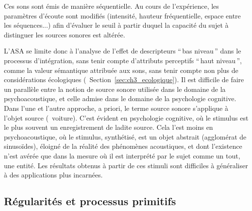Ces sons sont émis de manière séquentielle. Au cours de l'expérience, les paramètres d'écoute sont modifiés (intensité, hauteur fréquentielle, espace entre les séquences...) afin d'évaluer le seuil à partir duquel la capacité du sujet à distinguer les sources sonores est altérée.

L'ASA se limite donc à l'analyse de l'effet de descripteurs ``\,bas niveau\,'' dans le processus d'intégration, sans tenir compte d'attributs perceptifs ``\,haut niveau\,'', comme la valeur sémantique attribuée aux sons, sans tenir compte non plus de considérations écologiques (\cf~Section~\ref{sec:ch3_ecologique}). Il est difficile de faire un parallèle entre la notion de source sonore utilisée dans le domaine de la psychoacoustique, et celle admise dans le domaine de la psychologie cognitive. Dans l'une et l'autre approche, a priori, le terme source sonore s'applique à l'objet source (\eg~voiture). C'est évident en psychologie cognitive, où le stimulus est le plus souvent un enregistrement de ladite source. Cela l'est moins en psychoacoustique, où le stimulus, synthétisé, est un objet abstrait (agglomérat de sinusoïdes), éloigné de la réalité des phénomènes acoustiques, et dont l'existence n'est avérée que dans la mesure où il est interprété par le sujet comme un tout, une entité. Les résultats obtenus à partir de ces stimuli sont difficiles à généraliser à des applications plus incarnées.

\subsection{Régularités et processus primitifs}

